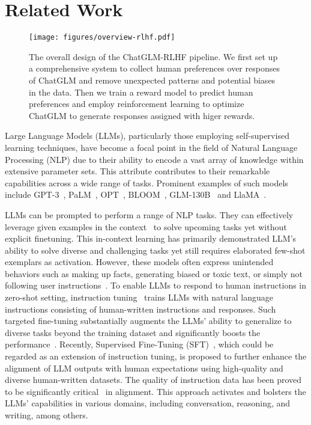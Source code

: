 \section{Related Work}

\begin{figure*}[ht]
    \centering
    \texttt{[image: figures/overview-rlhf.pdf]}
    \caption{The overall design of the ChatGLM-RLHF pipeline. \textmd{We first set up a comprehensive system to collect human preferences over responses of ChatGLM and remove unexpected patterns and potential biases in the data. Then we train a reward model to predict human preferences and employ reinforcement learning to optimize ChatGLM to generate responses assigned with higer rewards.}}
    \label{fig:overview}
\end{figure*}

Large Language Models (LLMs), particularly those employing self-supervised learning techniques, have become a focal point in the field of Natural Language Processing (NLP) due to their ability to encode a vast array of knowledge within extensive parameter sets. This attribute contributes to their remarkable capabilities across a wide range of tasks. Prominent examples of such models include GPT-3~\cite{brown2020language}, PaLM~\cite{chowdhery2023palm}, OPT~\cite{zhang2022opt}, BLOOM~\cite{workshop2022bloom}, GLM-130B~\cite{Du2021GLMGL,zeng2023glm} and LlaMA~\cite{touvron2023llama1,touvron2023llama}. 

LLMs
can be prompted to perform a range of NLP tasks. They can effectively leverage given examples in the context~\cite{brown2020language} to solve upcoming tasks yet without explicit finetuning. This in-context learning has primarily demonstrated LLM's ability to solve diverse and challenging tasks yet still requires elaborated few-shot exemplars as activation. 
However, these models often express unintended behaviors such as making up facts, generating biased or toxic text, or simply not following user instructions~\cite{bommasani2021opportunities,kenton2021alignment,bender2021dangers}.
To enable LLMs to respond to human instructions in zero-shot setting, instruction tuning~\cite{wei2021finetuned,chung2022scaling} trains LLMs with natural language instructions consisting of human-written instructions and responses.
Such targeted fine-tuning substantially augments the LLMs' ability to generalize to diverse tasks beyond the training dataset and significantly boosts the performance~\cite{longpre2023flan}.
Recently, Supervised Fine-Tuning (SFT)~\cite{ouyang2022training}, which could be regarded as an extension of instruction tuning, is proposed to further enhance the alignment of LLM outputs with human expectations using high-quality and diverse human-written datasets. The quality of instruction data has been proved to be significantly critical~\cite{zhou2023lima,touvron2023llama} in alignment. This approach activates and bolsters the LLMs' capabilities in various domains, including conversation, reasoning, and writing, among others. 

